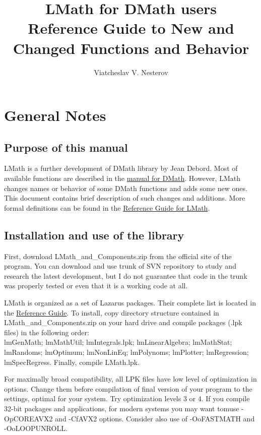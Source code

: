 \documentclass[12pt,a4paper,oneside]{article}
\begin{document}
\title{LMath for DMath users\\
{\Large Reference Guide to New and Changed Functions and Behavior}}
\author{Viatcheslav V. Nesterov}
\maketitle
\newpage
\label{toc}\tableofcontents
\newpage
\newlength{\tmplength}
\section{General Notes}
\subsection{Purpose of this manual}
LMath is a further development of DMath library by Jean Debord. Most of available functions are described in the \hyperref{file:DMath.pdf}{}{}{manual for DMath}. However, LMath changes names or behavior of some DMath functions and adds some new ones. This document contains brief description of such changes and additions. More formal definitions can be found in the \hyperref{file:LMath05.pdf}{}{}{Reference Guide for LMath}.  
\subsection{Installation and use of the library}
First, download LMath\_and\_Components.zip from the official site of the program. 
You can download and use trunk of SVN repository to study and research the latest development, but I do not guarantee that code in the trunk was properly tested or even that it is a working code at all. 

LMath is organized as a set of Lazarus packages. Their complete list is located in the \hyperref{file:LMath05.pdf}{}{}{Reference Guide}. To install, copy directory structure contained in LMath\_and\_Components.zip on your hard drive and compile packages (.lpk files) in the following order:\\
lmGenMath; lmMathUtil; lmIntegrals.lpk; lmLinearAlgebra; lmMathStat; lmRandoms; lmOptimum; lmNonLinEq; lmPolynoms; lmPlotter; lmRegression; \\ lmSpecRegress. Finally, compile LMath.lpk.
 
For maximally broad compatibility, all LPK files have low level of optimization in options. Change them before compilation of final version of your program to the settings, optimal for your system. Try optimization levels 3 or 4. If you compile 32-bit packages and applications, for modern systems you may want tomuse -OpCOREAVX2 and -CfAVX2 options. Consider also use of -OoFASTMATH and -OoLOOPUNROLL. 
\end{document}
